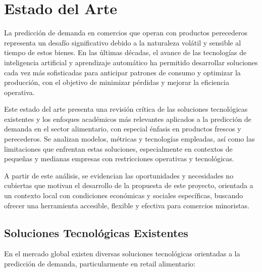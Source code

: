 \chapter{Estado del Arte}\label{chapter03}

La predicción de demanda en comercios que operan con productos perecederos representa un desafío significativo debido a la naturaleza volátil y sensible al tiempo de estos bienes. En las últimas décadas, el avance de las tecnologías de inteligencia artificial y aprendizaje automático ha permitido desarrollar soluciones cada vez más sofisticadas para anticipar patrones de consumo y optimizar la producción, con el objetivo de minimizar pérdidas y mejorar la eficiencia operativa.

Este estado del arte presenta una revisión crítica de las soluciones tecnológicas existentes y los enfoques académicos más relevantes aplicados a la predicción de demanda en el sector alimentario, con especial énfasis en productos frescos y perecederos. Se analizan modelos, métricas y tecnologías empleadas, así como las limitaciones que enfrentan estas soluciones, especialmente en contextos de pequeñas y medianas empresas con restricciones operativas y tecnológicas.

A partir de este análisis, se evidencian las oportunidades y necesidades no cubiertas que motivan el desarrollo de la propuesta de este proyecto, orientada a un contexto local con condiciones económicas y sociales específicas, buscando ofrecer una herramienta accesible, flexible y efectiva para comercios minoristas.

\section{Soluciones Tecnológicas Existentes}

En el mercado global existen diversas soluciones tecnológicas orientadas a la predicción de demanda, particularmente en retail alimentario:

